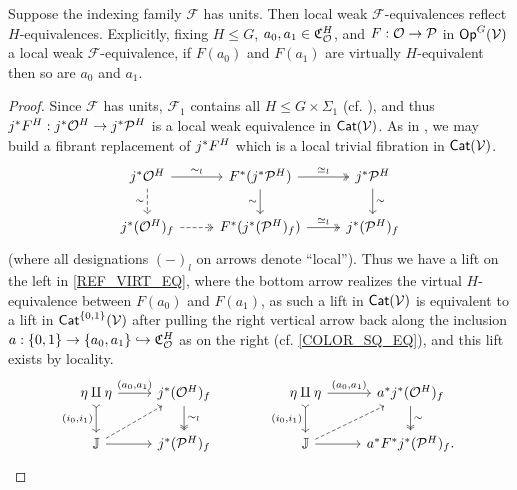 \documentclass[a4paper,10pt
,draft
]{article}%
\renewcommand{\F}{\mathcal F}
\newcommand{\J}{\mathbb J}
\renewcommand{\1}{\eta}%
\begin{document}
\begin{lemma}
      \label{REF_VIRT_LEM}
      Suppose the indexing family $\F$ has units.
      Then local weak $\F$-equivalences reflect $H$-equivalences.
      Explicitly,
      fixing $H \leq G$, 
      $a_0,a_1 \in \mathfrak C_{\mathcal{O}}^H$, and $F: \mathcal{O} \to \mathcal{P}$ in $\mathsf{Op}^G(\mathcal V)$ a local weak $\F$-equivalence,
      if $F(a_0)$ and $F(a_1)$ are virtually $H$-equivalent then so are $a_0$ and $a_1$.
\end{lemma}
\begin{proof}
      Since $\F$ has units, $\F_1$ contains all $H \leq G \times \Sigma_1$ (cf. \cite[Remark 4.50]{BP_geo}), and thus
      $j^{\**}F^H: j^{\**}\O^H \to j^{\**}\P^H$ is a local weak equivalence in $\mathsf{Cat}(\mathcal V)$.
      As in \cite{BM13}, we may build a fibrant replacement of $j^{\**}F^H$ which is a local trivial fibration in $\mathsf{Cat}(\mathcal V)$.
      \begin{equation}
            \begin{tikzcd}
                 j^{\**} \O^H \arrow[r, "\sim_l"] \arrow[d, dashed, "\sim"']
                  &
                  F^{\**} (j^{\**}\P^H) \arrow[r, "\simeq_l", two heads] \arrow[d, "\sim"']
                  &
                  j^{\**} \P^H \arrow[d, "\sim"]
                  \\
                  j^{\**} (\O^H)_f \arrow[r, dashed, two heads]
                  &
                  F^{\**} (j^{\**}(\P^H)_f) \arrow[r, "\simeq_l", two heads]
                  &
                  j^{\**}(\P^H)_f
            \end{tikzcd}
      \end{equation}
      (where all designations $(-)_l$ on arrows denote ``local'').
      Thus we have a lift on the left in \eqref{REF_VIRT_EQ},
      where the bottom arrow realizes the virtual $H$-equivalence between $F(a_0)$ and $F(a_1)$,
      as such a lift in $\mathsf{Cat}(\mathcal V)$ is equivalent to a lift in $\mathsf{Cat}^{\left\{0,1\right\}}(\mathcal V)$
      after pulling the right vertical arrow back along the inclusion
      $a: \left\{0,1\right\} \to \left\{a_0,a_1\right\} \hookrightarrow \mathfrak C_{\mathcal{O}}^H$ as on the right (cf. \eqref{COLOR_SQ_EQ}),
      and this lift exists by locality.
      \begin{equation}
            \label{REF_VIRT_EQ}
            \begin{tikzcd}
                  \1 \amalg \1 \arrow[r, "{(a_0,a_1)}"] \arrow[d, tail, "{(i_0, i_1)}"']
                  &
                  j^{\**}(\O^H)_f \arrow[d, two heads, "\sim_l"]
                  &&
                  \1 \amalg \1 \arrow[r, "{(a_0,a_1)}"] \arrow[d, tail, "{(i_0, i_1)}"']
                  &
                  a^{\**}j^{\**}(\O^H)_f \arrow[d, two heads, "\sim"]
                  \\
                  \J \arrow[r] \arrow[ur, dashed]
                  &
                  j^{\**}(\P^H)_f
                  &&
                  \J \arrow[r] \arrow[ur, dashed]
                  &
                  a^{\**} F^{\**} j^{\**}(\P^H)_f.
            \end{tikzcd}
      \end{equation}
\end{proof}
\end{document}
